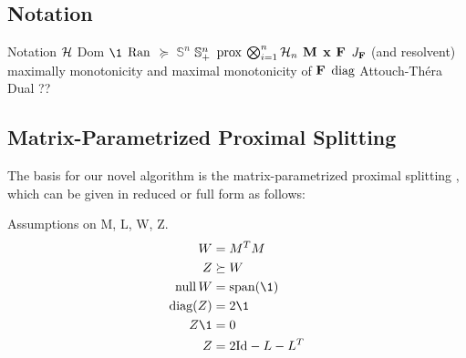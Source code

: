 \subsection{Notation}
Notation
$\mathcal{H}$
$\text{Dom}$
$\1$
$\operatorname{Ran}$
$\succeq$
$\mathbb{S}^n$
$\mathbb{S}_+^n$
$\operatorname{prox}$
$\bigotimes_{i=1}^n \mathcal{H}_n$
$\mathbf{M}$
$\mathbf{x}$
$\mathbf{F}$
$J_{\mathbf{F}}$ (and resolvent)
maximally monotonicity and maximal monotonicity of $\mathbf{F}$
$\text{diag}$
Attouch-Th\'era Dual ??
\subsection{Matrix-Parametrized Proximal Splitting}
The basis for our novel algorithm is the matrix-parametrized proximal splitting \cite{bassett2024optimaldesignresolventsplitting}, which can be given in reduced or full form as follows:

Assumptions on M, L, W, Z.
\begin{align}\label{oars}
    W &= M^T M \\
    Z &\succeq W \\
    \nullspace{W} &= \text{span}(\1)\\
    \text{diag}(Z) &=2\1 \\ 
    Z \1 &= 0 \\
    Z &= 2\I - L - L^T
\end{align} 
